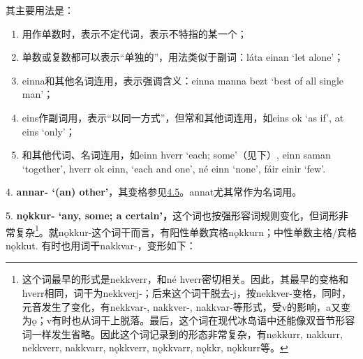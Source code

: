 其主要用法是：

\begin{enumerate}
  \def\labelenumi{\Alph{enumi}.}
  \item
        用作单数时，表示不定代词，表示不特指的某一个；
  \item
        单数或复数都可以表示``单独的''，用法类似于副词：láta einan `let
        alone'；
  \item
        einna和其他名词连用，表示强调含义：einna manna bezt `best of all
        single man'；
  \item
        eins作副词用，表示``以同一方式''，但常和其他词连用，如eins ok `as if',
        at eins `only'；
  \item
        和其他代词、名词连用，如einn hverr `each; some‌'（见下）, einn saman
        `together', hverr ok einn, `each and one', né einn `none', fáir einir
        `few'.
\end{enumerate}

4. \textbf{annar- `(an)
  other‌'}，其变格参见\hyperref[ux4e0dux89c4ux5219ux5f62ux5bb9ux8bcd]{4.5}。annat尤其常作为名词用。

5. \textbf{nǫkkur- `any, some; a
  certain‌'，}这个词也按强形容词规则变化，但词形非常复杂\footnote{这个词最早的形式是nekkverr，和né
  hverr密切相关。因此，其最早的变格和hverr相同，词干为nekkverj-；后来这个词干脱去-j，按nekkver-变格，同时，元音发生了变化，有nekkvar-,
  nakkver-,
  nakkvar-等形式，受v的影响，a又变为ǫ；v有时也从词干上脱落。最后，这个词在现代冰岛语中还能像双音节形容词一样发生省略。因此这个词记录到的形态非常复杂，有nøkkurr,
  nakkurr, nekkverr, nakkvarr, nǫkkverr, nǫkkvarr, nǫkkr, nǫkkurr等。}。就nǫkkur-这个词干而言，有阳性单数宾格nǫkkurn；中性单数主格/宾格nǫkkut.
有时也用词干nakkvar-，变形如下：

